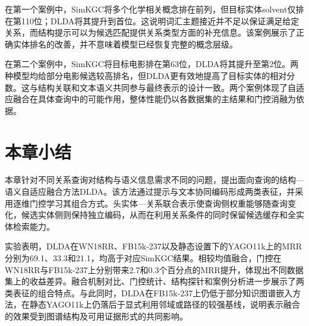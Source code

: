 在第一个案例中，SimKGC将多个化学相关概念排在前列，但目标实体solvent仅排在第110位；DLDA将其提升到首位。这说明词汇主题接近并不足以保证满足给定关系，而结构提示可以为候选匹配提供关系类型方面的补充信息。该案例展示了正确实体排名的改善，并不意味着模型已经恢复完整的概念层级。

在第二个案例中，SimKGC将目标电影排在第63位，DLDA将其提升至第2位。两种模型均给部分电影候选较高排名，但DLDA更有效地提高了目标实体的相对分数。这与结构关联和文本语义共同参与最终表示的设计一致。两个案例体现了自适应融合在具体查询中的可能作用，整体性能仍以各数据集的主结果和门控消融为依据。

\section{本章小结}

本章针对不同关系查询对结构与语义信息需求不同的问题，提出面向查询的结构—语义自适应融合方法DLDA。该方法通过提示与文本协同编码形成两类表征，并采用逐维门控学习其组合方式。头实体—关系联合表示使查询侧权重能够随查询变化，候选实体侧则保持独立编码，从而在利用关系条件的同时保留候选缓存和全实体检索能力。

实验表明，DLDA在WN18RR、FB15k-237以及静态设置下的YAGO11k上的MRR分别为69.1、33.3和21.1，均高于对应SimKGC结果。相较均值融合，门控在WN18RR与FB15k-237上分别带来2.7和0.3个百分点的MRR提升，体现出不同数据集上的收益差异。融合机制对比、门控统计、结构探针和案例分析进一步展示了两类表征的组合特点。与此同时，DLDA在FB15k-237上仍低于部分知识图谱嵌入方法，在静态YAGO11k上仍落后于显式利用邻域或路径的较强基线，说明表示融合的效果受到图谱结构及可用证据形式的共同影响。
